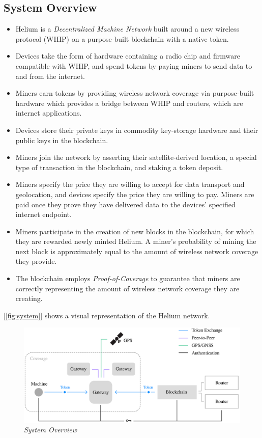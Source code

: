 \documentclass[UTF8, 10pt, nonatbib, nocopyrightspace, reprint]{sigplanconf}
\newcommand{\figref}[1]{[\autoref{#1}]}
\begin{document}
\subsection{System Overview}

\begin{itemize}
    \item Helium is a \emph{Decentralized Machine Network} built around a new wireless protocol (WHIP) on a purpose-built blockchain with a native token.
    \item Devices take the form of hardware containing a radio chip and firmware compatible with WHIP, and spend tokens by paying miners to send data to and from the internet.
    \item Miners earn tokens by providing wireless network coverage via purpose-built hardware which provides a bridge between WHIP and routers, which are internet applications.
    \item Devices store their private keys in commodity key-storage hardware and their public keys in the blockchain.
    \item Miners join the network by asserting their satellite-derived location, a special type of transaction in the blockchain, and staking a token deposit.
    \item Miners specify the price they are willing to accept for data transport and geolocation, and devices specify the price they are willing to pay. Miners are paid once they prove they have delivered data to the devices' specified internet endpoint.
    \item Miners participate in the creation of new blocks in the blockchain, for which they are rewarded newly minted Helium. A miner's probability of mining the next block is approximately equal to the amount of wireless network coverage they provide.
    \item The blockchain employs \emph{Proof-of-Coverage} to guarantee that miners are correctly representing the amount of wireless network coverage they are creating.
\end{itemize}

\figref{fig:system} shows a visual representation of the Helium network.

\begin{figure}[ht]
    \begin{center}
          \includegraphics[width=\textwidth]{schematic.eps}
          \caption{\emph{System Overview}}
          \label{fig:system}
     \end{center}
\end{figure}
\end{document}
